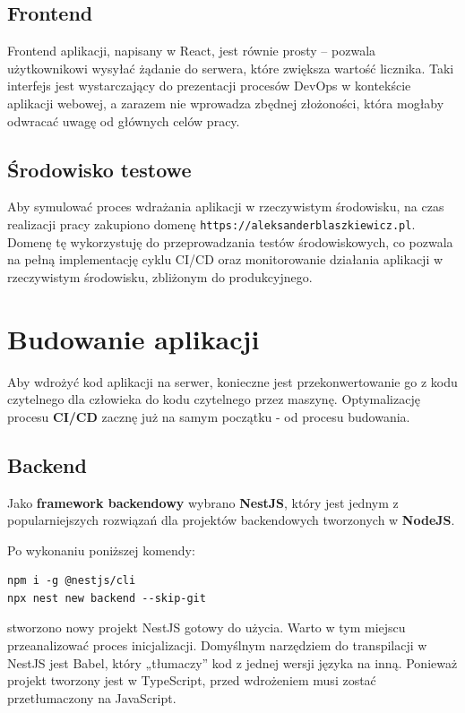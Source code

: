 \documentclass{article}
\begin{document}
\subsection{Frontend}

Frontend aplikacji, napisany w React, jest równie prosty – pozwala użytkownikowi wysyłać żądanie do serwera, które zwiększa wartość licznika. Taki interfejs jest wystarczający do prezentacji procesów DevOps w kontekście aplikacji webowej, a zarazem nie wprowadza zbędnej złożoności, która mogłaby odwracać uwagę od głównych celów pracy.

\subsection{Środowisko testowe}

Aby symulować proces wdrażania aplikacji w rzeczywistym środowisku, na czas realizacji pracy zakupiono domenę \lstinline|https://aleksanderblaszkiewicz.pl|. Domenę tę wykorzystuję do przeprowadzania testów środowiskowych, co pozwala na pełną implementację cyklu CI/CD oraz monitorowanie działania aplikacji w rzeczywistym środowisku, zbliżonym do produkcyjnego.

\section{Budowanie aplikacji} \label{sectionBudowanieAplikacji}

Aby wdrożyć kod aplikacji na serwer, konieczne jest przekonwertowanie go z kodu czytelnego dla człowieka do kodu czytelnego przez maszynę. Optymalizację procesu \textbf{CI/CD} zacznę już na samym początku - od procesu budowania.

\subsection{Backend}

Jako \textbf{framework backendowy} wybrano \textbf{NestJS}, który jest jednym z popularniejszych rozwiązań dla projektów backendowych tworzonych w \textbf{NodeJS}.

Po wykonaniu poniższej komendy:
\begin{lstlisting}[caption=Komenda uruchamiająca scaffolding projektu NestJS]
npm i -g @nestjs/cli
npx nest new backend --skip-git
\end{lstlisting}

stworzono nowy projekt NestJS gotowy do użycia. Warto w tym miejscu przeanalizować proces inicjalizacji. Domyślnym narzędziem do transpilacji w NestJS jest Babel, który „tłumaczy” kod z jednej wersji języka na inną. Ponieważ projekt tworzony jest w TypeScript, przed wdrożeniem musi zostać przetłumaczony na JavaScript.
\end{document}
